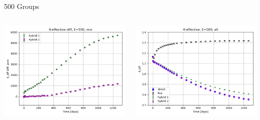 \documentclass[
	11pt, %
	aspectratio=169, %
]{beamer}
\begin{document}
\begin{frame}{500 Groups}
\begin{columns}[c]
\begin{column}{0.32\textwidth}
			\includegraphics[width=\textwidth]{../figures/keff/keff_mix_500_diff.png}
		\end{column}
		\begin{column}{0.32\textwidth} %
			\includegraphics[width=\textwidth]{../figures/keff/keff_all_500.png}


\end{column}
\end{columns}
\end{frame}
\end{document}
